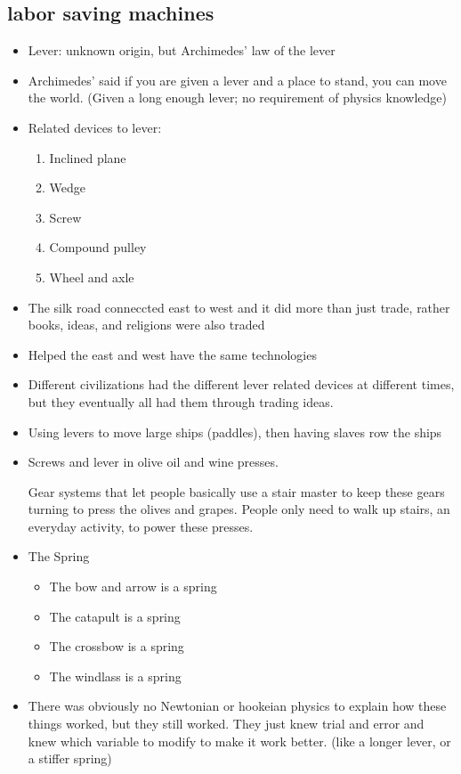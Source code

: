 \documentclass{article}
\begin{document}
\subsection{labor saving machines}
\begin{itemize}
  \item Lever: unknown origin, but Archimedes' law of the lever
  \item Archimedes' said if you are given a lever and a place to stand,
    you can move the world. (Given a long enough lever; no requirement of physics knowledge)
  \item Related devices to lever:
    \begin{enumerate}
      \item Inclined plane
      \item Wedge
      \item Screw
      \item Compound pulley
      \item Wheel and axle
    \end{enumerate}
  \item The silk road conneccted east to west and it did more than just trade,
    rather books, ideas, and religions were also traded
  \item Helped the east and west have the same technologies
  \item Different civilizations had the different lever related devices at different times,
    but they eventually all had them through trading ideas.
  \item Using levers to move large ships (paddles), then having
    slaves row the ships
  \item Screws and lever in olive oil and wine presses.

    Gear systems that let people basically use a stair master to keep these
    gears turning to press the olives and grapes. People only need to walk up stairs,
    an everyday activity, to power these presses.
  \item The Spring
    \begin{itemize}
      \item The bow and arrow is a spring
      \item The catapult is a spring
      \item The crossbow is a spring
      \item The windlass is a spring
      \end{itemize}
  \item There was obviously no Newtonian or hookeian physics
    to explain how these things worked, but they still worked.
    They just knew trial and error and knew which variable to modify
    to make it work better. (like a longer lever, or a stiffer spring)


\end{itemize}
\end{document}
